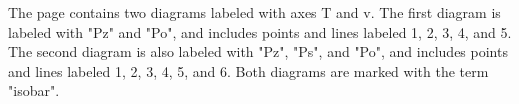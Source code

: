 The page contains two diagrams labeled with axes T and v. The first diagram is labeled with "Pz" and "Po", and includes points and lines labeled 1, 2, 3, 4, and 5. The second diagram is also labeled with "Pz", "Ps", and "Po", and includes points and lines labeled 1, 2, 3, 4, 5, and 6. Both diagrams are marked with the term "isobar".